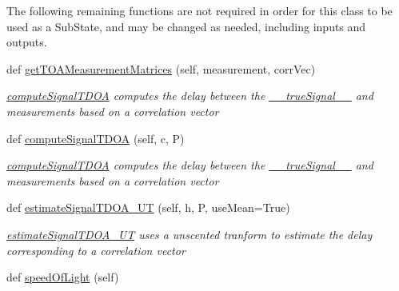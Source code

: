 The following remaining functions are not required in order for this class to be used as a Sub\+State, and may be changed as needed, including inputs and outputs.\begin{DoxyCompactItemize}
\item 
def \hyperlink{classmodest_1_1substates_1_1correlationvector_1_1CorrelationVector_a71f11fa45819ecb464890be81ecc9781}{get\+T\+O\+A\+Measurement\+Matrices} (self, measurement, corr\+Vec)
\begin{DoxyCompactList}\small\item\em \hyperlink{classmodest_1_1substates_1_1correlationvector_1_1CorrelationVector_a93ab1b2a798ddca9f1557557c7bc35fc}{compute\+Signal\+T\+D\+OA} computes the delay between the \hyperlink{classmodest_1_1substates_1_1correlationvector_1_1CorrelationVector_af2f52cea1c695f36dd100f529c322e94}{\+\_\+\+\_\+true\+Signal\+\_\+\+\_\+} and measurements based on a correlation vector \end{DoxyCompactList}\item 
def \hyperlink{classmodest_1_1substates_1_1correlationvector_1_1CorrelationVector_a93ab1b2a798ddca9f1557557c7bc35fc}{compute\+Signal\+T\+D\+OA} (self, c, P)
\begin{DoxyCompactList}\small\item\em \hyperlink{classmodest_1_1substates_1_1correlationvector_1_1CorrelationVector_a93ab1b2a798ddca9f1557557c7bc35fc}{compute\+Signal\+T\+D\+OA} computes the delay between the \hyperlink{classmodest_1_1substates_1_1correlationvector_1_1CorrelationVector_af2f52cea1c695f36dd100f529c322e94}{\+\_\+\+\_\+true\+Signal\+\_\+\+\_\+} and measurements based on a correlation vector \end{DoxyCompactList}\item 
def \hyperlink{classmodest_1_1substates_1_1correlationvector_1_1CorrelationVector_aa31a2d2e5216f801c0c01c4d1a4eab8a}{estimate\+Signal\+T\+D\+O\+A\+\_\+\+UT} (self, h, P, use\+Mean=True)
\begin{DoxyCompactList}\small\item\em \hyperlink{classmodest_1_1substates_1_1correlationvector_1_1CorrelationVector_aa31a2d2e5216f801c0c01c4d1a4eab8a}{estimate\+Signal\+T\+D\+O\+A\+\_\+\+UT} uses a unscented tranform to estimate the delay corresponding to a correlation vector \end{DoxyCompactList}\item 
def \hyperlink{classmodest_1_1substates_1_1correlationvector_1_1CorrelationVector_a5b95e0a827fb233f2f1a40f2cff9d3f0}{speed\+Of\+Light} (self)

\end{DoxyCompactItemize}
